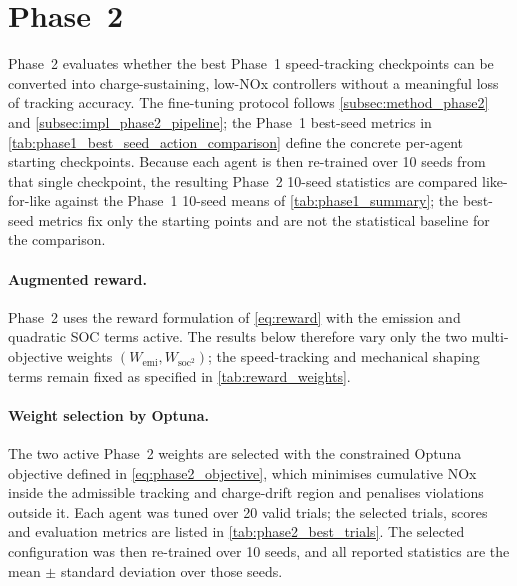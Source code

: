 


\section{Phase~2}
\label{sec:results_phase2}
Phase~2 evaluates whether the best Phase~1 speed-tracking checkpoints can be converted into charge-sustaining, low-\ac{NOx} controllers without a meaningful loss of tracking accuracy. The fine-tuning protocol follows \autoref{subsec:method_phase2} and \autoref{subsec:impl_phase2_pipeline}; the Phase~1 best-seed metrics in \autoref{tab:phase1_best_seed_action_comparison} define the concrete per-agent starting checkpoints. Because each agent is then re-trained over 10 seeds from that single checkpoint, the resulting Phase~2 10-seed statistics are compared like-for-like against the Phase~1 10-seed means of \autoref{tab:phase1_summary}; the best-seed metrics fix only the starting points and are not the statistical baseline for the comparison.

\paragraph{Augmented reward.} Phase~2 uses the reward formulation of \autoref{eq:reward} with the emission and quadratic \ac{SOC} terms active. The results below therefore vary only the two multi-objective weights $(W_{\text{emi}}, W_{\text{soc}^2})$; the speed-tracking and mechanical shaping terms remain fixed as specified in \autoref{tab:reward_weights}.

\paragraph{Weight selection by Optuna.} The two active Phase~2 weights are selected with the constrained Optuna objective defined in \autoref{eq:phase2_objective}, which minimises cumulative \ac{NOx} inside the admissible tracking and charge-drift region and penalises violations outside it. Each agent was tuned over 20 valid trials; the selected trials, scores and evaluation metrics are listed in \autoref{tab:phase2_best_trials}. The selected configuration was then re-trained over 10 seeds, and all reported statistics are the mean $\pm$ standard deviation over those seeds.

